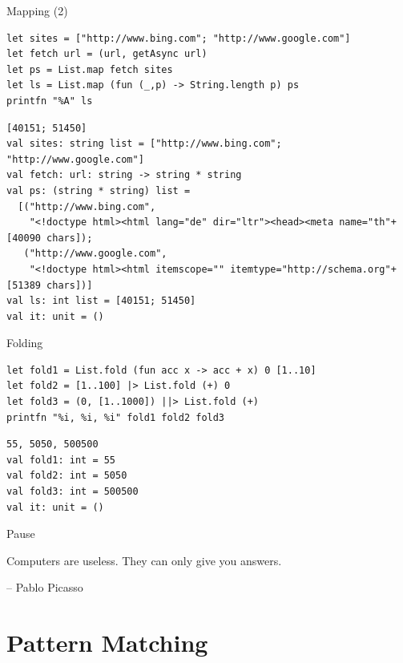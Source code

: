 \documentclass[t]{beamer}
\begin{document}
\begin{frame}[label={sec:org398a00f},fragile]{Mapping (2)}
 \tiny
\begin{verbatim}
let sites = ["http://www.bing.com"; "http://www.google.com"]
let fetch url = (url, getAsync url)
let ps = List.map fetch sites
let ls = List.map (fun (_,p) -> String.length p) ps
printfn "%A" ls
\end{verbatim}

\begin{verbatim}
[40151; 51450]
val sites: string list = ["http://www.bing.com"; "http://www.google.com"]
val fetch: url: string -> string * string
val ps: (string * string) list =
  [("http://www.bing.com",
    "<!doctype html><html lang="de" dir="ltr"><head><meta name="th"+[40090 chars]);
   ("http://www.google.com",
    "<!doctype html><html itemscope="" itemtype="http://schema.org"+[51389 chars])]
val ls: int list = [40151; 51450]
val it: unit = ()
\end{verbatim}
\end{frame}


\begin{frame}[label={sec:orgafb33fb},fragile]{Folding}
 \begin{verbatim}
let fold1 = List.fold (fun acc x -> acc + x) 0 [1..10]
let fold2 = [1..100] |> List.fold (+) 0
let fold3 = (0, [1..1000]) ||> List.fold (+)
printfn "%i, %i, %i" fold1 fold2 fold3
\end{verbatim}

\begin{verbatim}
55, 5050, 500500
val fold1: int = 55
val fold2: int = 5050
val fold3: int = 500500
val it: unit = ()
\end{verbatim}
\end{frame}

\begin{frame}[label={sec:org1f91c07}]{Pause}
\begin{block}{}
Computers are useless. They can only give you answers.

\null\hfill-- Pablo Picasso
\end{block}
\end{frame}


\section{Pattern Matching }
\label{sec:orgeba6c48}
\end{document}
